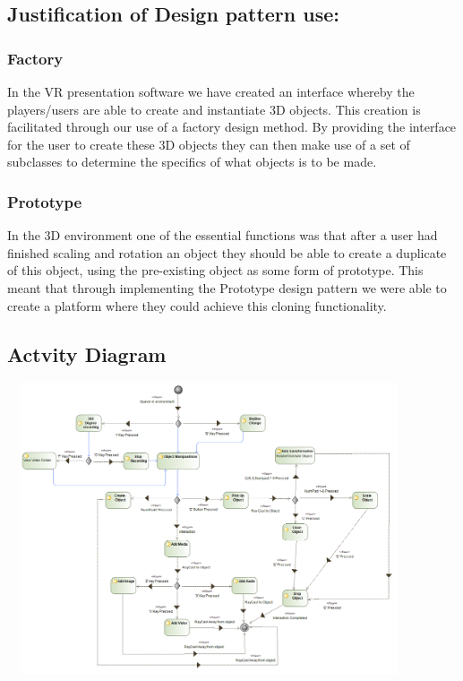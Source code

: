 \documentclass{article}
\begin{document}
  	\subsection{Justification of Design pattern use:}
  	\subsubsection{Factory}
  	In the VR presentation software we have created an interface whereby the players/users are able to create and instantiate 3D objects. This creation is facilitated through our use of a factory design method. By providing the interface for the user to create these 3D objects they can then make use of a set of subclasses to determine the specifics of what objects is to be made.\\
  	\subsubsection{Prototype}
  	In the 3D environment one of the essential functions was that after a user had finished scaling and rotation an object they should be able to create a duplicate of this object, using the pre-existing object as some form of prototype. This meant that through implementing the Prototype design pattern we were able to create a platform where they could achieve this cloning functionality.
    \subsection{Actvity Diagram}
  	\includegraphics[width=450px,height=325px]{ActivityDiagram.png}
\end{document}
